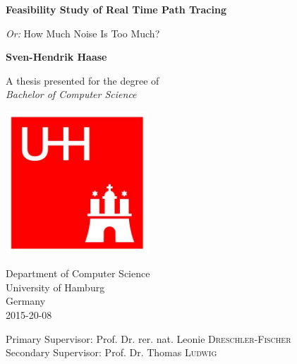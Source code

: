 \begin{titlepage}
    \begin{center}
        \Huge
        \textbf{Feasibility Study of Real Time Path Tracing}
        
        \vspace{0.5cm}

        \LARGE
        \textit{Or:} How Much Noise Is Too Much?
        
        \vspace{1.5cm}
        
        \textbf{Sven-Hendrik Haase}
        
        \vfill
        
        A thesis presented for the degree of\\
        \emph{Bachelor of Computer Science}
        
        \vspace{0.8cm}
        
        \includegraphics[width=0.4\textwidth]{frontbackmatter/logo_uhh.jpg}
        
        
        \Large
        Department of Computer Science\\
        University of Hamburg\\
        Germany\\
        2015-20-08

        \vspace{0.8cm}

        \large
        Primary Supervisor: Prof. Dr. rer. nat. Leonie \textsc{Dreschler-Fischer}\\
        Secondary Supervisor: Prof. Dr. Thomas \textsc{Ludwig}
        
    \end{center}
\end{titlepage}
